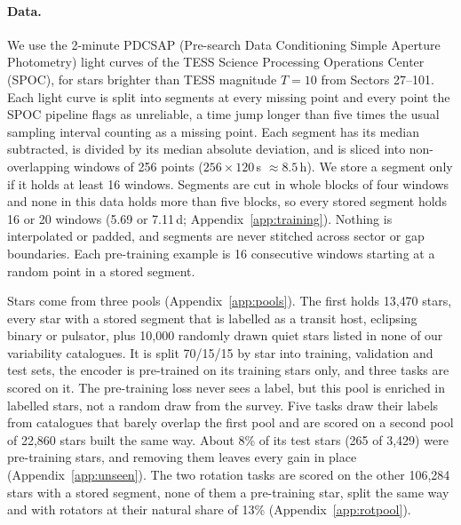 \documentclass{article}
\begin{document}
\paragraph{Data.} We use the 2-minute PDCSAP (Pre-search Data Conditioning Simple Aperture
Photometry) light curves of the TESS Science Processing Operations Center (SPOC), for stars brighter than TESS magnitude
$T = 10$ from Sectors 27--101. Each light curve is split into segments at every missing point
and every point the SPOC pipeline flags as unreliable, a time jump longer than five times the usual
sampling interval counting as a missing point. Each segment has its median subtracted, is divided by
its median absolute deviation, and is sliced into non-overlapping windows of 256 points ($256 \times 120$\,s $\approx 8.5$\,h). We store a segment only if it holds
at least 16 windows. Segments are cut in whole blocks of four windows and none in this data holds
more than five blocks, so every stored segment holds 16 or 20 windows (5.69 or 7.11\,d;
Appendix~\ref{app:training}). Nothing is interpolated or padded, and segments are never stitched
across sector or gap boundaries. Each pre-training example is 16 consecutive windows starting at a
random point in a stored segment.

Stars come from three pools (Appendix~\ref{app:pools}). The first holds 13{,}470 stars, every star
with a stored segment that is labelled as a transit host, eclipsing binary or pulsator, plus
10{,}000 randomly drawn quiet stars listed in none of our variability catalogues. It is split
70/15/15 by star into training, validation and test sets, the encoder is pre-trained on its training
stars only, and three tasks are scored on it. The pre-training loss never sees a label, but this pool
is enriched in labelled stars, not a random draw from the survey. Five tasks draw their labels from
catalogues that barely overlap the first pool and are scored on a second pool of 22{,}860 stars built
the same way. About 8\% of its test stars (265 of 3{,}429) were pre-training stars, and removing them
leaves every gain in place (Appendix~\ref{app:unseen}). The two rotation tasks are scored on the
other 106{,}284 stars with a stored segment, none of them a pre-training star, split the same way and
with rotators at their natural share of 13\% (Appendix~\ref{app:rotpool}).
\end{document}
